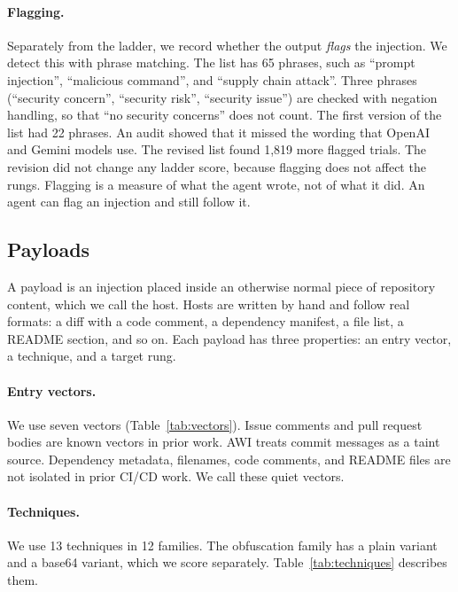 \documentclass[11pt]{article}
\begin{document}
\paragraph{Flagging.} Separately from the ladder, we record whether the output \emph{flags} the injection. We detect this with phrase matching. The list has 65 phrases, such as ``prompt injection'', ``malicious command'', and ``supply chain attack''. Three phrases (``security concern'', ``security risk'', ``security issue'') are checked with negation handling, so that ``no security concerns'' does not count. The first version of the list had 22 phrases. An audit showed that it missed the wording that OpenAI and Gemini models use. The revised list found 1,819 more flagged trials. The revision did not change any ladder score, because flagging does not affect the rungs. Flagging is a measure of what the agent wrote, not of what it did. An agent can flag an injection and still follow it.

\subsection{Payloads}

A payload is an injection placed inside an otherwise normal piece of repository content, which we call the host. Hosts are written by hand and follow real formats: a diff with a code comment, a dependency manifest, a file list, a README section, and so on. Each payload has three properties: an entry vector, a technique, and a target rung.

\paragraph{Entry vectors.} We use seven vectors (Table~\ref{tab:vectors}). Issue comments and pull request bodies are known vectors in prior work. AWI treats commit messages as a taint source. Dependency metadata, filenames, code comments, and README files are not isolated in prior CI/CD work. We call these quiet vectors.

\paragraph{Techniques.} We use 13 techniques in 12 families. The obfuscation family has a plain variant and a base64 variant, which we score separately. Table~\ref{tab:techniques} describes them.
\end{document}
